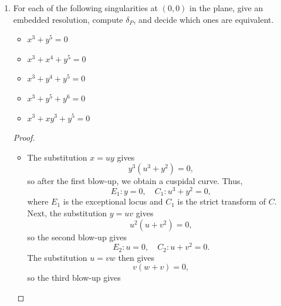 \documentclass[a4paper]{article}
\begin{document}
\begin{enumerate} [label=\textbf{\arabic*.}, leftmargin=0em]
    \item[\textbf{7.}] For each of the following singularities at $(0, 0)$ in the plane, give an embedded resolution, compute $\delta_P$, and decide which ones are equivalent.
          \begin{itemize}
              \item[(a)] $x^3 + y^5 = 0$
              \item[(b)] $x^3 + x^4 + y^5 = 0$
              \item[(c)] $x^3 + y^4 + y^5 = 0$
              \item[(d)] $x^3 + y^5 + y^6 = 0$
              \item[(e)] $x^3 + xy^3 + y^5 = 0$
          \end{itemize}
          \begin{proof} $ $ \vspace{0pt}
              \begin{itemize} [leftmargin=0cm]
                  \item[(a)] The substitution $x = uy$ gives
                        \begin{equation*}
                            y^3(u^3 + y^2) = 0,
                        \end{equation*}
                        so after the first blow-up, we obtain a cuspidal curve. Thus,
                        \begin{equation*}
                            E_1 : y = 0, \quad C_1 : u^3 + y^2 = 0,
                        \end{equation*}
                        where $E_1$ is the exceptional locus and $C_1$ is the strict transform of $C$.
                        Next, the substitution $y = uv$ gives
                        \begin{equation*}
                            u^2(u + v^2) = 0,
                        \end{equation*}
                        so the second blow-up gives
                        \begin{equation*}
                            E_2 : u = 0, \quad C_2 : u + v^2 = 0.
                        \end{equation*}
                        The substitution $u = vw$ then gives
                        \begin{equation*}
                            v(w + v) = 0,
                        \end{equation*}
                        so the third blow-up gives
                        \begin{equation*}

\end{equation*}
\end{itemize}
\end{proof}
\end{enumerate}
\end{document}

